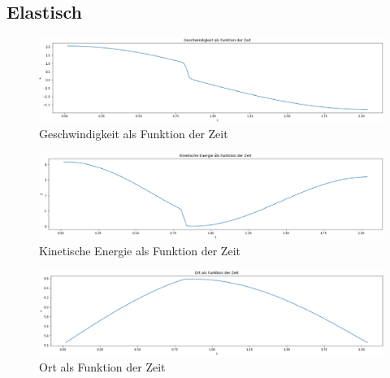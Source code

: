 \documentclass[../main.tex]{subfiles}
\begin{document}
    \subsection{Elastisch}

    \begin{figure}[H]
        \begin{center}
            \centerline{\includegraphics[width=155mm]{./images/Elastisch/GeschwindigkeitAlsFunktionDerZeit}}
            \caption{Geschwindigkeit als Funktion der Zeit}
            \label{fig:GeschwindigkeitAlsFunktionDerZeit}
        \end{center}
    \end{figure}

    \begin{figure}[H]
        \begin{center}
            \centerline{\includegraphics[width=155mm]{./images/Elastisch/KinetischeEnergieAlsFunktionDerZeit}}
            \caption{Kinetische Energie als Funktion der Zeit}
            \label{fig:KinetischeEnergieAlsFunktionDerZeit}
        \end{center}
    \end{figure}

    \begin{figure}[H]
        \begin{center}
            \centerline{\includegraphics[width=155mm]{./images/Elastisch/OrtAlsFunktionDerZeit}}
            \caption{Ort als Funktion der Zeit}
            \label{fig:OrtAlsFunktionDerZeit}
        \end{center}
    \end{figure}
\end{document}
